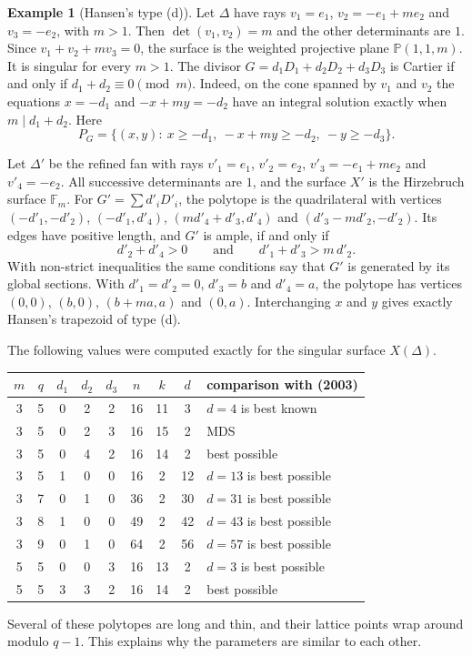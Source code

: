 \documentclass[12pt,letterpaper]{article}
\numberwithin{equation}{section}
\theoremstyle{definition}
\newtheorem{example}[theorem]{Example}
\theoremstyle{remark}
\newcommand{\F}{\mathbb{F}}
\newcommand{\PP}{\mathbb{P}}
\begin{document}
\begin{example}[Hansen's type (d)]\label{example:fan2}
Let $\Delta$ have rays $v_1=e_1$, $v_2=-e_1+me_2$ and $v_3=-e_2$, with $m>1$.
Then $\det(v_1,v_2)=m$ and the other determinants are $1$. Since
$v_1+v_2+mv_3=0$, the surface is the weighted projective plane $\PP(1,1,m)$.
It is singular for every $m>1$. The divisor $G=d_1D_1+d_2D_2+d_3D_3$ is Cartier
if and only if $d_1+d_2\equiv0\pmod m$. Indeed, on the cone spanned by $v_1$
and $v_2$ the equations $x=-d_1$ and $-x+my=-d_2$ have an integral solution
exactly when $m\mid d_1+d_2$. Here
\[
P_G=\{(x,y):\ x\ge-d_1,\ -x+my\ge-d_2,\ -y\ge-d_3\}.
\]

Let $\Delta'$ be the refined fan with rays $v'_1=e_1$, $v'_2=e_2$,
$v'_3=-e_1+me_2$ and $v'_4=-e_2$. All successive determinants are $1$, and the
surface $X'$ is the Hirzebruch surface $\F_m$. For
$G'=\sum d'_iD'_i$, the polytope is the quadrilateral with vertices
$(-d'_1,-d'_2)$, $(-d'_1,d'_4)$, $(md'_4+d'_3,d'_4)$ and
$(d'_3-md'_2,-d'_2)$. Its edges have positive length, and $G'$ is ample, if and
only if
\[
d'_2+d'_4>0\qquad\text{and}\qquad d'_1+d'_3>m\,d'_2 .
\]
With non-strict inequalities the same conditions say that $G'$ is generated by
its global sections. With
$d'_1=d'_2=0$, $d'_3=b$ and $d'_4=a$, the polytope has vertices $(0,0)$,
$(b,0)$, $(b+ma,a)$ and $(0,a)$. Interchanging $x$ and $y$ gives exactly
Hansen's trapezoid of type (d).

The following values were computed exactly for the singular surface
$X(\Delta)$.
\begin{center}
\small
\begin{tabular}{@{}ccccccccl@{}}
\toprule
$m$ & $q$ & $d_1$ & $d_2$ & $d_3$ & $n$ & $k$ & $d$ &
comparison with \cite{Br98} (2003)\\
\midrule
3 & 5 & 0 & 2 & 2 & 16 & 11 & 3 & $d=4$ is best known\\
3 & 5 & 0 & 2 & 3 & 16 & 15 & 2 & MDS\\
3 & 5 & 0 & 4 & 2 & 16 & 14 & 2 & best possible\\
3 & 5 & 1 & 0 & 0 & 16 & 2 & 12 & $d=13$ is best possible\\
3 & 7 & 0 & 1 & 0 & 36 & 2 & 30 & $d=31$ is best possible\\
3 & 8 & 1 & 0 & 0 & 49 & 2 & 42 & $d=43$ is best possible\\
3 & 9 & 0 & 1 & 0 & 64 & 2 & 56 & $d=57$ is best possible\\
5 & 5 & 0 & 0 & 3 & 16 & 13 & 2 & $d=3$ is best possible\\
5 & 5 & 3 & 3 & 2 & 16 & 14 & 2 & best possible\\
\bottomrule
\end{tabular}
\end{center}
Several of these polytopes are long and thin, and their lattice points wrap
around modulo $q-1$. This explains why the parameters are similar to each
other.
\end{example}
\end{document}
